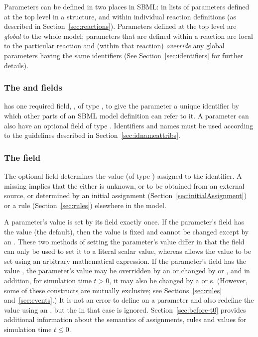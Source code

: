 Parameters can be defined in two places in SBML: in lists of
parameters defined at the top level in a \Model structure, and
within individual reaction definitions (as described in
Section~\ref{sec:reactions}).  Parameters defined at the top level
are \emph{global} to the whole model; parameters that are defined
within a reaction are local to the particular reaction and (within
that reaction) \emph{override} any global parameters having the
same identifiers (See Section~\ref{sec:identifiers} for further
details).


\subsubsection{The  and  fields}

\Parameter has one required field, , of type
, to give the parameter a unique identifier by which
other parts of an SBML model definition can refer to it.  A
parameter can also have an optional  field of type
.  Identifiers and names must be used according
to the guidelines described in Section~\ref{sec:idnameattribs}.


\subsubsection{The  field}
\label{sec:parameter-value}


The optional field  determines the value (of type
) assigned to the identifier.  A missing
 implies that the  either is unknown, or
to be obtained from an external source, or determined by an
initial assignment (Section~\ref{sec:initialAssignment}) or a rule
(Section~\ref{sec:rules}) elsewhere in the model.

A parameter's value is set by its  field exactly
once.  If the parameter's  field has the value
 (the default), then the value is fixed and cannot be
changed except by an \InitialAssignment.  These two methods of
setting the parameter's value differ in that the 
field can only be used to set it to a literal scalar value,
whereas \InitialAssignment allows the value to be set using an
arbitrary mathematical expression.  If the parameter's
 field has the value , the parameter's
value may be overridden by an \InitialAssignment or changed by
\AssignmentRule or \AlgebraicRule, and in addition, for simulation
time $t > 0$, it may also be changed by a \RateRule or \Event{}s.
(However, some of these constructs are mutually exclusive; see
Sections~\ref{sec:rules} and~\ref{sec:events}.)  It is not an
error to define  on a parameter and also redefine the
value using an \InitialAssignment, but the  in that
case is ignored.  Section~\ref{sec:before-t0} provides additional
information about the semantics of assignments, rules and values
for simulation time $t \leq 0$.


